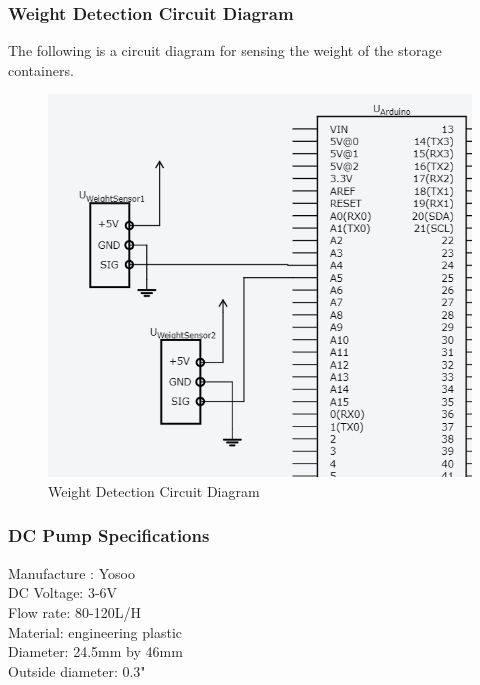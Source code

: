 \documentclass [10pt]{article}
\begin{document}

\subsubsection{Weight Detection Circuit Diagram}
The following is a circuit diagram for sensing the weight of the storage containers.
\begin{figure} [h!]
	\centering
	\includegraphics [scale = 0.5] {Figures/WeightSensors.png}
	\caption{Weight Detection Circuit Diagram}
\end{figure}


\subsubsection{DC Pump Specifications}
Manufacture : Yosoo \\
DC Voltage: 3-6V\\
Flow rate: 80-120L/H\\
Material: engineering plastic\\
Diameter: 24.5mm by 46mm \\
Outside diameter:  0.3" 

\end{document}
